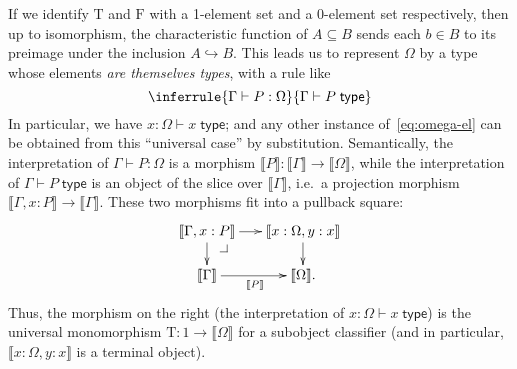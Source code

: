 \documentclass[12pt]{article}
\makeatletter
\newcommand{\pullback}[1][dr]{\save*!/#1-1.7pc/#1:(-1,1)@^{|-}\restore}
\def\ty{\;\mathsf{type}}
\def\m#1{\llbracket#1\rrbracket}
\def\types{\vdash}
\def\true{\mathrm{T}}
\def\false{\mathrm{F}}
\numberwithin{equation}{section}
\makeatother
\begin{document}
If we identify $\true$ and $\false$ with a 1-element set and a 0-element set respectively, then up to isomorphism, the characteristic function of $A\subseteq B$ sends each $b\in B$ to its preimage under the inclusion $A\hookrightarrow B$.
This leads us to represent $\Omega$ by a type whose elements \emph{are themselves types}, with a rule like
\begin{equation}
  \inferrule{\Gamma \types P:\Omega}{\Gamma \types P\ty}\label{eq:omega-el}
\end{equation}
In particular, we have $x:\Omega \types x\ty$; and any other instance of~\eqref{eq:omega-el} can be obtained from this ``universal case'' by substitution.
Semantically, the interpretation of $\Gamma \types P:\Omega$ is a morphism $\m P : \m \Gamma \to \m \Omega$, while the interpretation of $\Gamma \types P\ty$ is an object of the slice over $\m\Gamma$, i.e.\ a projection morphism $\m{\Gamma, x:P} \to \m \Gamma$.
These two morphisms fit into a pullback square: %
\[ \xymatrix@-.7pc{
\m{\Gamma,x:P} \ar[r] \ar[d] \pullback &
\m{x:\Omega, y:x} \ar[d] \\
\m{\Gamma} \ar[r]_{\m P} & \m\Omega.
}\]
Thus, the morphism on the right (the interpretation of $x:\Omega \types x\ty$) is the universal monomorphism $\true:1\to \m\Omega$ for a subobject classifier (and in particular, $\m{x:\Omega, y:x}$ is a terminal object).
\end{document}
